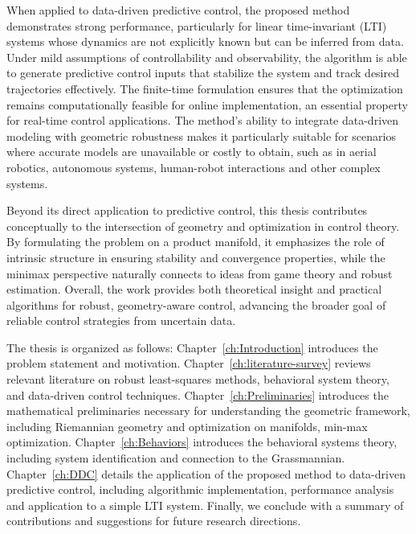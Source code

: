 {        When applied to data-driven predictive control, the proposed method demonstrates strong performance, particularly for linear time-invariant (LTI) systems whose dynamics are not explicitly known but can be inferred from data. Under mild assumptions of controllability and observability, the algorithm is able to generate predictive control inputs that stabilize the system and track desired trajectories effectively. The finite-time formulation ensures that the optimization remains computationally feasible for online implementation, an essential property for real-time control applications. The method's ability to integrate data-driven modeling with geometric robustness makes it particularly suitable for scenarios where accurate models are unavailable or costly to obtain, such as in aerial robotics, autonomous systems, human-robot interactions and other complex systems.

        Beyond its direct application to predictive control, this thesis contributes conceptually to the intersection of geometry and optimization in control theory. By formulating the problem on a product manifold, it emphasizes the role of intrinsic structure in ensuring stability and convergence properties, while the minimax perspective naturally connects to ideas from game theory and robust estimation. Overall, the work provides both theoretical insight and practical algorithms for robust, geometry-aware control, advancing the broader goal of reliable control strategies from uncertain data.

        The thesis is organized as follows: Chapter~\ref{ch:Introduction} introduces the problem statement and motivation. Chapter~\ref{ch:literature-survey} reviews relevant literature on robust least-squares methods, behavioral system theory, and data-driven control techniques. Chapter~\ref{ch:Preliminaries} introduces the mathematical preliminaries necessary for understanding the geometric framework, including Riemannian geometry and optimization on manifolds, min-max optimization. Chapter~\ref{ch:Behaviors} introduces the behavioral systems theory, including system identification and connection to the Grassmannian. Chapter~\ref{ch:DDC} details the application of the proposed method to data-driven predictive control, including algorithmic implementation, performance analysis and application to a simple LTI system. Finally, we conclude with a summary of contributions and suggestions for future research directions.
}

\newcommand*{\Subject}{%
    Robust Least-Squares Optimization for Data-Driven Predictive Control
}

\newcommand*{\Keywords}{%
    \textcolor{red}{Least-Squares, Data-Driven, Predictive Control, Robust Optimization}
}
\newcommand*{\KeywordsPlaintext}{%
    Least-Squares, Data-Driven, Predictive Control, Robust Optimization
}

